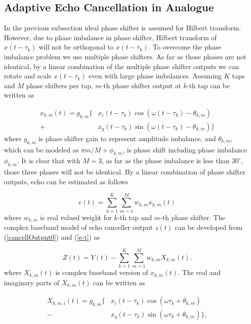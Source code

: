 \documentclass[twocolumn]{IEEEtran}
\begin{document}
\subsection{Adaptive Echo Cancellation in Analogue}

In the previous subsection ideal phase shifter is assumed for
Hilbert transform. However, due to phase imbalance in phase shifter,
Hilbert transform of $x(t-\tau_k)$ will not be orthogonal to
$x(t-\tau_k)$. To overcome the phase imbalance problem we use
multiple phase shifters. As far as those phases are not identical,
by a linear combination of the multiple phase shifter outputs we can
rotate and scale $x(t-\tau_k)$ even with large phase imbalances.
Assuming $K$ taps and $M$ phase shifters per tap, $m$-th phase
shifter output at $k$-th tap can be written as

\begin{align}\label{x-t}
x_{k,m}(t)= g_{k,m} \{ & x_i(t-\tau_k) \cos (\omega (t-\tau_k)
-\theta_{k,m}) \nonumber \\
+& x_q(t-\tau_k) \sin (\omega (t-\tau_k) -\theta_{k,m})\}
\end{align}
where $g_{k,m}$ is phase shifter gain to represent amplitude
imbalance, and $\theta_{k,m}$, which can be modeled as $\pi
m/M+\phi_{k,m}$, is phase shift including phase imbalance
$\phi_{k,m}$. It is clear that with $M=3$, as far as the phase
imbalance is less than $30^\circ$, those three phases will not be
identical. By a linear combination of phase shifter outputs, echo
can be estimated as follows

\begin{equation}\label{e-t}
e(t)= \sum_{k=1}^{K} \sum_{m=1}^{M} w_{k,m} x_{k,m}(t)
\end{equation}
where $w_{k,m}$ is real valued weight for $k$-th tap and $m$-th
phase shifter. The complex baseband model of echo canceller output
$z(t)$ can be developed from (\ref{cancellOutput0}) and (\ref{e-t})
as

\begin{equation}
Z(t)=Y(t)-\sum_{k=1}^{K} \sum_{m=1}^{M} w_{k,m} X_{k,m}(t).
\end{equation}
where $X_{k,m}(t)$ is complex baseband version of $x_{k,m}(t)$. The
real and imaginary parts of $X_{k,m}(t)$ can be written as

\begin{align}\label{X-kmi}
X_{k,m,i}(t)= g_{k,m} \{ & x_i(t-\tau_k) \cos ( \omega \tau_k
+\theta_{k,m}) \nonumber \\
-& x_q(t-\tau_k) \sin (\omega \tau_k +\theta_{k,m})\},
\end{align}
\end{document}
